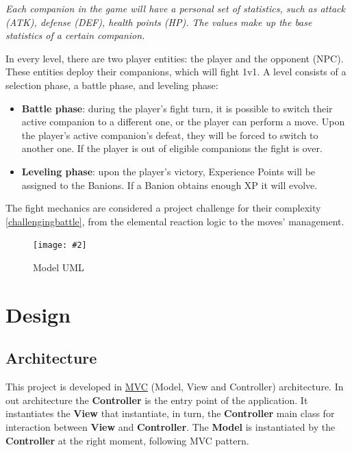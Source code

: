 \documentclass[12pt, a4paper]{report}
\newcommand*{\MyIncludeGraphics}[2][]{%
\begin{adjustbox}{max size={\textwidth}{\textheight}}
    \texttt{[image: \#2]}%
\end{adjustbox}
}
\begin{document}
    \textit{Each companion in the game will have a personal set of statistics, such as attack (ATK), defense (DEF), health points (HP).
    The values make up the base statistics of a certain companion.}

    In every level, there are two player entities: the player and the opponent (NPC). These entities deploy their companions, which will fight 1v1.
    A level consists of a selection phase, a battle phase, and leveling phase:
\begin{itemize}
    \item \textbf{Battle phase}: during the player's fight turn, it is possible to switch their active companion to a different one, 
        or the player can perform a move. Upon the player's active companion's defeat, they will be forced to switch to another one. 
        If the player is out of eligible companions the fight is over.
    \item \textbf{Leveling phase}: upon the player's victory, Experience Points will be assigned to the Banions. If a Banion obtains enough XP it will evolve.
\end{itemize}

    The fight mechanics are considered a project challenge for their complexity \ref{challengingbattle}, from the elemental reaction logic to the moves' management.

    \begin{figure}[H]
    \centering{}
    \caption{Model UML}
    \MyIncludeGraphics{model}
    \end{figure}

\chapter{Design}

\section{Architecture}

    This project is developed in \href{https://en.wikipedia.org/wiki/Model%E2%80%93view%E2%80%93controller}{MVC} (Model, View and Controller) architecture.
    In out architecture the \textbf{Controller} is the entry point of the application. It instantiates the \textbf{View} that instantiate, in turn, the
    \textbf{Controller} main class for interaction between \textbf{View} and \textbf{Controller}. The \textbf{Model} is instantiated by the \textbf{Controller}
    at the right moment, following MVC pattern.
\end{document}
